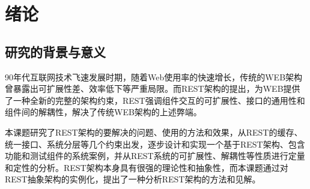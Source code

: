 
\chapter{绪论}
\label{chap:introduction}

\section{研究的背景与意义}
	90年代互联网技术飞速发展时期，随着Web使用率的快速增长，传统的WEB架构曾暴露出可扩展性差、效率低下等严重局限。而REST架构的提出，为WEB提供了一种全新的完整的架构约束，REST强调组件交互的可扩展性、接口的通用性和组件间的解耦性，解决了传统WEB架构的上述弊端。

本课题研究了REST架构的要解决的问题、使用的方法和效果，从REST的缓存、统一接口、系统分层等几个约束出发，逐步设计和实现一个基于REST架构、包含功能和测试组件的系统案例，并从REST系统的可扩展性、解耦性等性质进行定量和定性的分析。REST架构本身具有很强的理论性和抽象性，而本课题通过对REST抽象架构的实例化，提出了一种分析REST架构的方法和见解。